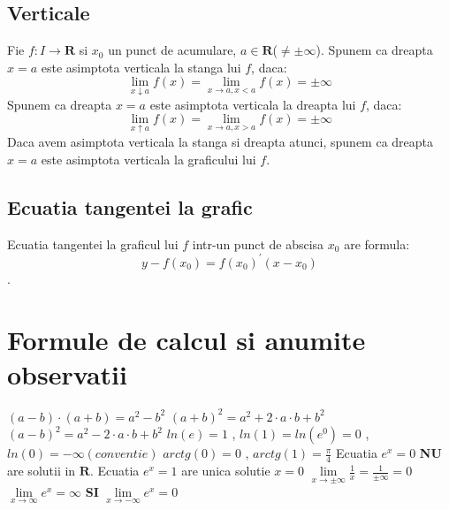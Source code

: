 \documentclass[11pt]{article}
\begin{document}
\subsection*{Verticale}
    \begin{flushleft}
        \qquad Fie $f:I \to \mathbf{R}$ si $x_0$ un punct de acumulare, $a \in \mathbf{R}$($\ne \pm
        \infty$).
        \newline
        \qquad Spunem ca dreapta $x = a$ este asimptota verticala la stanga lui $f$, daca: 
        \[\lim_{x \downarrow a } f(x) = \lim_{x \to a, x < a} f(x) = \pm \infty\]
         \qquad Spunem ca dreapta $x = a$ este asimptota verticala la dreapta lui $f$, daca: 
        \[\lim_{x \uparrow a } f(x) = \lim_{x \to a, x > a} f(x) = \pm \infty\] 
        \qquad Daca avem asimptota verticala la stanga si dreapta atunci, spunem ca dreapta $x = a$ este 
        asimptota verticala la graficului lui $f$.
    \end{flushleft}
    
\subsection*{Ecuatia tangentei la grafic}
    \begin{flushleft}
        \qquad Ecuatia tangentei la graficul lui $f$ intr-un punct de abscisa $x_0$ are formula:
        \[y - f(x_0) = f(x_0)^\prime(x - x_0)\].
    \end{flushleft}
    
\section*{Formule de calcul si anumite observatii}
    \begin{flushleft}
        $(a - b)\cdot (a + b) = a^2 - b^2$ \newline
        $(a+b)^2 = a^2 + 2\cdot a\cdot b + b^2$ \newline
        $(a-b)^2 = a^2 - 2\cdot a\cdot b + b^2$ \newline
        $ln(e) = 1$ , $ln(1) = ln(e^0) = 0$ , $ln(0) = - \infty (conventie)$ \newline
        $arctg(0) = 0$ , $arctg(1) = \frac{\pi}{4}$ \newline
        Ecuatia $e^x = 0$ \textbf{NU} are solutii in $\mathbf{R}$. \newline
        Ecuatia $e^x = 1$ are unica solutie $x = 0$ \newline
        $\lim\limits_{x \to \pm \infty} \frac{1}{x} = \frac{1}{\pm \infty} = 0$ \newline
        $\lim\limits_{x \to \infty} e^x = \infty$ \textbf{SI}  $\lim\limits_{x \to -\infty} e^x = 0$
    \end{flushleft}
\end{document}
